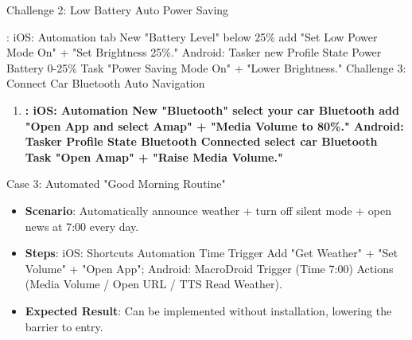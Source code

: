 Challenge 2: Low Battery Auto Power Saving

\begin{tcbpractice}{: iOS: Automation tab New "Battery Level" below 25\% add "Set Low Power Mode On" + "Set Brightness 25\%." Android: Tasker new Profile State Power Battery 0-25\% Task "Power Saving Mode On" + "Lower Brightness."}
Challenge 3: Connect Car Bluetooth Auto Navigation

\begin{enumerate}
  \item \textbf{: iOS: Automation New "Bluetooth" select your car Bluetooth add "Open App and select Amap" + "Media Volume to 80\%." Android: Tasker Profile State Bluetooth Connected select car Bluetooth Task "Open Amap" + "Raise Media Volume."}
\end{enumerate}

\end{tcbpractice}

\begin{tcbinfo}{Case 3: Automated "Good Morning Routine"}
\begin{itemize}
  \item \textbf{Scenario}: Automatically announce weather + turn off silent mode + open news at 7:00 every day.
  \item \textbf{Steps}: iOS: Shortcuts Automation Time Trigger Add "Get Weather" + "Set Volume" + "Open App"; Android: MacroDroid Trigger (Time 7:00) Actions (Media Volume / Open URL / TTS Read Weather).
  \item \textbf{Expected Result}: Can be implemented without installation, lowering the barrier to entry.
\end{itemize}

\end{tcbinfo}
